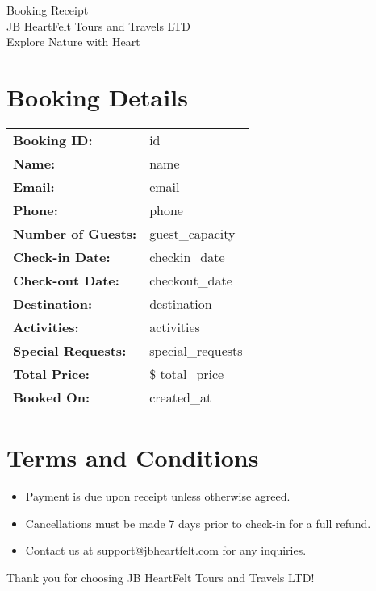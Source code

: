 \documentclass[a4paper,12pt]{article}
\begin{document}
\begin{center}
    \vspace{1cm}
    {\Large \color{darkgreen} Booking Receipt} \\
    \vspace{0.5cm}
    {\normalsize JB HeartFelt Tours and Travels LTD} \\
    {\small Explore Nature with Heart}
\end{center}

\vspace{1cm}
\section*{Booking Details}
\begin{tabular}{@{}ll@{}}
    \textbf{Booking ID:} & {{ id }} \\
    \textbf{Name:} & {{ name }} \\
    \textbf{Email:} & {{ email }} \\
    \textbf{Phone:} & {{ phone }} \\
    \textbf{Number of Guests:} & {{ guest_capacity }} \\
    \textbf{Check-in Date:} & {{ checkin_date }} \\
    \textbf{Check-out Date:} & {{ checkout_date }} \\
    \textbf{Destination:} & {{ destination }} \\
    \textbf{Activities:} & {{ activities }} \\
    \textbf{Special Requests:} & {{ special_requests }} \\
    \textbf{Total Price:} & \$ {{ total_price }} \\
    \textbf{Booked On:} & {{ created_at }} \\
\end{tabular}

\vspace{1cm}
\section*{Terms and Conditions}
\begin{itemize}
    \item Payment is due upon receipt unless otherwise agreed.
    \item Cancellations must be made 7 days prior to check-in for a full refund.
    \item Contact us at support@jbheartfelt.com for any inquiries.
\end{itemize}

\vspace{1cm}
\begin{center}
    {\small Thank you for choosing JB HeartFelt Tours and Travels LTD!}
\end{center}
\end{document}
